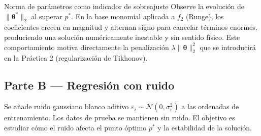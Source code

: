 \begin{observacion}{Norma de parámetros como indicador de sobreajuste}
Observe la evolución de \(\|\boldsymbol{\theta}^*\|_2\) al superar \(p^*\). En la base monomial aplicada a \(f_2\) (Runge), los coeficientes crecen en magnitud y alternan signo para cancelar términos enormes, produciendo una solución numéricamente inestable y sin sentido físico. Este comportamiento motiva directamente la penalización \(\lambda\|\boldsymbol{\theta}\|_2^2\) que se introducirá en la Práctica 2 (regularización de Tikhonov).
\end{observacion}

\subsection*{Parte B — Regresión con ruido}
\label{sec:parteB}

Se añade ruido gaussiano blanco aditivo $\varepsilon_i \sim \mathcal{N}(0, \sigma_\varepsilon^2)$ a las ordenadas de entrenamiento. Los datos de prueba se mantienen sin ruido. El objetivo es estudiar cómo el ruido afecta el punto óptimo $p^*$ y la estabilidad de la solución.

